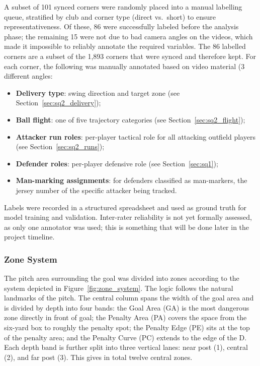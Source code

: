 A subset of 101 synced corners were randomly placed into a manual labelling queue, stratified 
by club and corner type (direct vs.\ short) to ensure representativeness. Of these, 
86 were successfully labeled before the analysis phase; the remaining 15 were not due to 
bad camera angles on the videos, which made it impossible to reliably annotate the required variables. 
The 86 labelled corners are a subset of the 1,893 corners that were synced and therefore 
kept. For each corner, the following was manually annotated based on video material (3 different angles:
\begin{itemize}
  \item \textbf{Delivery type}: swing direction and target zone (see
        Section~\ref{sec:sq2_delivery});
  \item \textbf{Ball flight}: one of five trajectory categories
        (see Section~\ref{sec:sq2_flight});
  \item \textbf{Attacker run roles}: per-player tactical role for all attacking
        outfield players (see Section~\ref{sec:sq2_runs});
  \item \textbf{Defender roles}: per-player defensive role
        (see Section~\ref{sec:sq1});
  \item \textbf{Man-marking assignments}: for defenders classified as man-markers,
        the jersey number of the specific attacker being tracked.
\end{itemize}
Labels were recorded in a structured spreadsheet
 and used as ground truth for model training
and validation.
Inter-rater reliability is not yet formally assessed, as only one annotator was
used; this is something that will be done later in the project timeline.

\subsubsection{Zone System}
The pitch area surrounding the goal was divided into zones according to the
system depicted in Figure~\ref{fig:zone_system}. The logic follows the natural
landmarks of the pitch. The central column spans the width of the goal area and
is divided by depth into four bands: the Goal Area (GA) is the most
dangerous zone directly in front of goal; the Penalty Area (PA) covers
the space from the six-yard box to roughly the penalty spot; the
Penalty Edge (PE) sits at the top of the penalty area; and the
Penalty Curve (PC) extends to the edge of the D. Each depth band is
further split into three vertical lanes: near post (1), central (2), and far
post (3). This gives in total twelve central zones.

